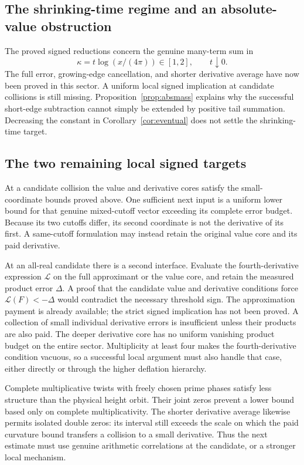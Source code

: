 \documentclass[11pt]{article}
\numberwithin{equation}{section}
\theoremstyle{definition}
\theoremstyle{remark}
\begin{document}
\subsection{The shrinking-time regime and an absolute-value obstruction}
The proved signed reductions concern the genuine many-term sum in
\begin{equation}\label{eq:kapparegime}
 \kappa=t\log(x/(4\pi))\in[1,2],\qquad t\downarrow0.
\end{equation}
The full error, growing-edge cancellation, and shorter derivative
average have now been proved in this sector. A uniform local signed
implication at candidate collisions is still missing. Proposition~\ref{prop:absmass} explains why the successful short-edge
subtraction cannot simply be extended by positive tail summation.
Decreasing the constant in Corollary~\ref{cor:eventual} does not
settle the shrinking-time target.

\subsection{The two remaining local signed targets}
At a candidate collision the value and derivative cores satisfy the
small-coordinate bounds proved above. One sufficient next input is a
uniform lower bound for that genuine mixed-cutoff vector exceeding its
complete error budget. Because its two cutoffs differ, its second
coordinate is not the derivative of its first. A same-cutoff formulation
may instead retain the original value core and its paid derivative.

At an all-real candidate there is a second interface. Evaluate the
fourth-derivative expression $\mathscr L$ on the full approximant or the
value core, and retain the measured product error $\Delta$. A proof that
the candidate value and derivative conditions force
$\mathscr L(F)<-\Delta$ would contradict the necessary threshold sign.
The approximation payment is already available; the strict signed
implication has not been proved. A collection of small individual
derivative errors is insufficient unless their products are also paid.
The deeper derivative core has no uniform vanishing product budget on
the entire sector. Multiplicity at least four makes the fourth-derivative
condition vacuous, so a successful local argument must also handle that
case, either directly or through the higher deflation hierarchy.

Complete multiplicative twists with freely chosen prime phases satisfy
less structure than the physical height orbit. Their joint zeros prevent
a lower bound based only on complete multiplicativity. The shorter
derivative average likewise permits isolated double zeros: its interval
still exceeds the scale on which the paid curvature bound transfers a
collision to a small derivative. Thus the next estimate must use genuine
arithmetic correlations at the candidate, or a stronger local mechanism.
\end{document}
